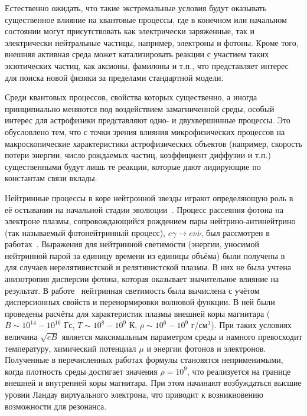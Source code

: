 Естественно ожидать, что такие экстремальные условия будут оказывать существенное 
влияние на квантовые процессы, где в конечном или начальном состоянии могут присутствовать 
как электрически заряженные, так и 
электрически нейтральные частицы, например, электроны и фотоны. Кроме того, внешняя 
активная среда может катализировать реакции с участием таких экзотических частиц, как 
аксионы, фамилоны и т.п., что представляет интерес для поиска новой физики за пределами 
стандартной модели. 


Среди квантовых процессов, свойства которых существенно, а иногда
принципиально меняются под воздействием  замагниченной среды, особый интерес 
для астрофизики представляют одно- и двухвершинные процессы. Это обусловлено тем, 
что с точки зрения влияния микрофизических процессов на макроскопические характеристики астрофизических 
объектов (например, скорость потери энергии, число рождаемых частиц, коэффициент диффузии и т.п.)
существенными будут лишь те реакции, которые дают лидирующие по константам связи вклады.




Нейтринные процессы в коре нейтронной звезды играют определяющую роль в её остывании на начальной стадии эволюции~\cite{Yakovlev2000}. 
Процесс рассеяния фотона на электроне плазмы, сопровождающийся рождением пары нейтрино-антинейтрино (так называемый 
фотонейтринный процесс), $e\gamma\to e\nu\bar\nu$, был рассмотрен в работах~\cite{RumCh,Skobelev:2000,BorKer2,RumChMik}. 
Выражения для нейтринной светимости (энергии, уносимой нейтринной парой за единицу времени из единицы объёма) были получены 
в~\cite{RumCh,BorKer2} для случаев нерелятивистской и релятивистской плазмы. В них не была учтена анизотропия дисперсии фотона, 
которая оказывает значительное влияние на результат. В работе~\cite{RumChMik} нейтринная светимость была вычислена с учётом дисперсионных 
свойств и перенормировки волновой функции. В ней были проведены расчёты для характеристик плазмы внешней коры магнитара 
($B\sim 10^{14}-10^{16}$ Гс, $T\sim 10^8 - 10^9$ К, $\rho\sim 10^6-10^9$ г/см$^3$). При таких условиях величина $\sqrt{eB}$ 
является максимальным параметром среды и намного превосходит температуру, химический потенциал $\mu$ и энергии фотонов и 
электронов. Полученные в перечисленных работах формулы становятся неприменимыми, когда плотность среды достигает значения 
$\rho = 10^9$, что реализуется на границе внешней и внутренней коры магнитара. При этом начинают возбуждаться высшие уровни 
Ландау виртуального электрона, что приводит к возникновению возможности для резонанса.

